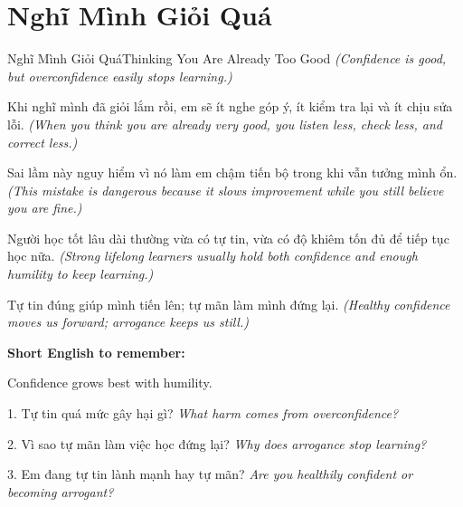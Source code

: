 \section{Nghĩ Mình Giỏi Quá}
\begin{truyen}{Nghĩ Mình Giỏi Quá}{Thinking You Are Already Too Good}
\textit{(Confidence is good, but overconfidence easily stops learning.)}

Khi nghĩ mình đã giỏi lắm rồi, em sẽ ít nghe góp ý, ít kiểm tra lại và ít chịu sửa lỗi.
\textit{(When you think you are already very good, you listen less, check less, and correct less.)}

Sai lầm này nguy hiểm vì nó làm em chậm tiến bộ trong khi vẫn tưởng mình ổn.
\textit{(This mistake is dangerous because it slows improvement while you still believe you are fine.)}

Người học tốt lâu dài thường vừa có tự tin, vừa có độ khiêm tốn đủ để tiếp tục học nữa.
\textit{(Strong lifelong learners usually hold both confidence and enough humility to keep learning.)}
\end{truyen}

\begin{baihoc}
Tự tin đúng giúp mình tiến lên; tự mãn làm mình đứng lại.
\textit{(Healthy confidence moves us forward; arrogance keeps us still.)}
\end{baihoc}

\begin{ghinhoanh}
\textbf{Short English to remember:}

Confidence grows best with humility.

\end{ghinhoanh}

\begin{tuhocnhanh}
1. Tự tin quá mức gây hại gì? \textit{What harm comes from overconfidence?}

2. Vì sao tự mãn làm việc học đứng lại? \textit{Why does arrogance stop learning?}

3. Em đang tự tin lành mạnh hay tự mãn? \textit{Are you healthily confident or becoming arrogant?}
\end{tuhocnhanh}
\ngancach

